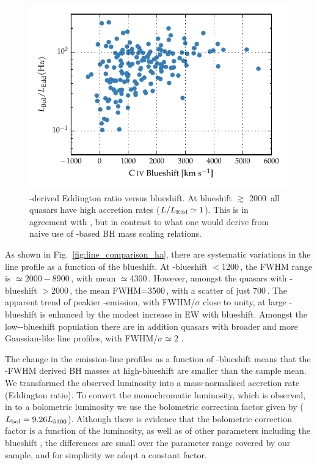 \begin{figure}
    \centering
    \includegraphics[width=0.8\linewidth]{figures/chapter03/ha_edd_civ_bs.pdf}
    \caption{\hans-derived Eddington ratio versus  blueshift. At blueshift $\gtrsim$ 2000\kms\, all quasars have high accretion rates ($L/L_{\rm Edd} \simeq 1$). This is in agreement with \citet{kratzer15}, but in contrast to what one would derive from naive use of -based BH mass scaling relations.}
    \label{fig:ha_edd_civ_bs}
\end{figure}

As shown in Fig.~\ref{fig:line_comparison_ha}, there are systematic variations in the \ha line profile as a function of the  blueshift. 
At -blueshift $<$1200\,\kms, the \ha FWHM range is $\simeq2000 - 8900$\,\kms, with mean $\simeq$4300\,\kms.
However, amongst the quasars with -blueshift $>$2000\,\kms, the mean \ha FWHM=3500\,\kms, with a scatter of just 700\,\kms. 
The apparent trend of peakier \hans-emission, with FWHM/$\sigma$ close to unity, at large -blueshift is enhanced by the modest increase in \ha EW with blueshift. 
Amongst the low--blueshift population there are in addition quasars with broader and more Gaussian-like \ha line profiles, with FWHM/$\sigma \simeq 2$ . 

The change in the \ha emission-line profiles as a function of -blueshift means that the \hans-FWHM derived BH masses at high-blueshift are smaller than the sample mean. 
We transformed the observed luminosity into a mass-normalised accretion rate (Eddington ratio).
To convert the monochromatic luminosity, which is observed, in to a bolometric luminosity we use the bolometric correction factor given by \citet{richards06} ($L_{\rm bol} = 9.26L_{5100}$).
Although there is evidence that the bolometric correction factor is a function of the luminosity, as well as of other parameters including the  blueshift \citep{krawczyk13}, the differences are small over the parameter range covered by our sample, and for simplicity we adopt a constant factor. 

